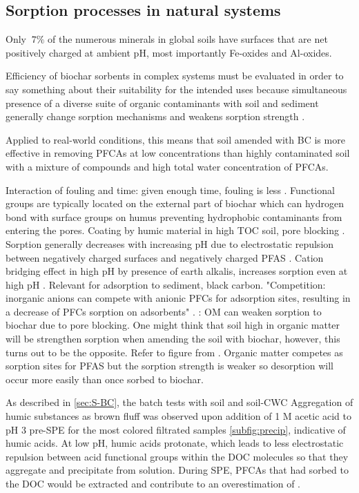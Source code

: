 \subsection{Sorption processes in natural systems}\label{sec:natural}
Only $~7\%$ of the numerous minerals in global soils have surfaces that are net positively charged at ambient pH, most importantly Fe-oxides and Al-oxides. 

Efficiency of biochar sorbents in complex systems must be evaluated in order to say something about their suitability for the intended uses because simultaneous presence of a diverse suite of organic contaminants with soil and sediment generally change sorption mechanisms and weakens sorption strength \citep{zhou2010sorption}.

Applied to real-world conditions, this means that soil amended with BC is more effective in removing PFCAs at low concentrations than highly contaminated soil with a mixture of compounds and high total water concentration of PFCAs.

Interaction of fouling and time: given enough time, fouling is less \citep{Werner2006}. Functional groups are typically located on the external part of biochar which can hydrogen bond with surface groups on humus preventing hydrophobic contaminants from entering the pores. Coating by humic material in high TOC soil, pore blocking \citep{Hale2011}.
Sorption generally decreases with increasing pH due to electrostatic repulsion between negatively charged surfaces and negatively charged PFAS \citep{du2014adsorption}. Cation bridging effect in high pH by presence of earth alkalis, increases sorption even at high pH \citep{du2014adsorption}. Relevant for adsorption to sediment, black carbon. "Competition: inorganic anions can compete with anionic PFCs for adsorption sites, resulting in a decrease of PFCs sorption on adsorbents" \citep{du2014adsorption}. 
\citep{Sormo2021}: OM can weaken sorption to biochar due to pore blocking. One might think that soil high in organic matter will be strengthen sorption when amending the soil with biochar, however, this turns out to be the opposite. Refer to figure from \citep{Cornelissen2005}. Organic matter competes as sorption sites for PFAS but the sorption strength is weaker so desorption will occur more easily than once sorbed to biochar. 

As described in \cref{sec:S-BC}, the batch tests with soil and soil-CWC Aggregation of humic substances as brown fluff was observed upon addition of 1 M acetic acid to pH 3 pre-SPE for the most colored filtrated samples \cref{subfig:precip}, indicative of humic acids. At low pH, humic acids protonate, which leads to less electrostatic repulsion between acid functional groups within the DOC molecules so that they aggregate and precipitate from solution. During SPE, PFCAs that had sorbed to the DOC would be extracted and contribute to an overestimation of . 

